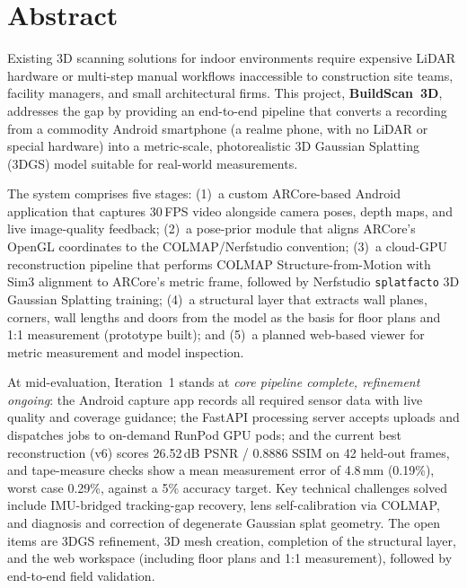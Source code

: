 \chapter*{Abstract}

Existing 3D scanning solutions for indoor environments require expensive LiDAR hardware or multi-step manual workflows inaccessible to construction site teams, facility managers, and small architectural firms. This project, \textbf{BuildScan~3D}, addresses the gap by providing an end-to-end pipeline that converts a recording from a commodity Android smartphone (a realme phone, with no LiDAR or special hardware) into a metric-scale, photorealistic 3D Gaussian Splatting (3DGS) model suitable for real-world measurements.

The system comprises five stages: (1)~a custom ARCore-based Android application that captures 30\,FPS video alongside camera poses, depth maps, and live image-quality feedback; (2)~a pose-prior module that aligns ARCore's OpenGL coordinates to the COLMAP/Nerfstudio convention; (3)~a cloud-GPU reconstruction pipeline that performs COLMAP Structure-from-Motion with Sim3 alignment to ARCore's metric frame, followed by Nerfstudio \texttt{splatfacto} 3D Gaussian Splatting training; (4)~a structural layer that extracts wall planes, corners, wall lengths and doors from the model as the basis for floor plans and 1:1 measurement (prototype built); and (5)~a planned web-based viewer for metric measurement and model inspection.

At mid-evaluation, Iteration~1 stands at \emph{core pipeline complete, refinement ongoing}: the Android capture app records all required sensor data with live quality and coverage guidance; the FastAPI processing server accepts uploads and dispatches jobs to on-demand RunPod GPU pods; and the current best reconstruction (v6) scores 26.52\,dB PSNR / 0.8886 SSIM on 42 held-out frames, and tape-measure checks show a mean measurement error of 4.8\,mm (0.19\%), worst case 0.29\%, against a 5\% accuracy target. Key technical challenges solved include IMU-bridged tracking-gap recovery, lens self-calibration via COLMAP, and diagnosis and correction of degenerate Gaussian splat geometry. The open items are 3DGS refinement, 3D mesh creation, completion of the structural layer, and the web workspace (including floor plans and 1:1 measurement), followed by end-to-end field validation.
